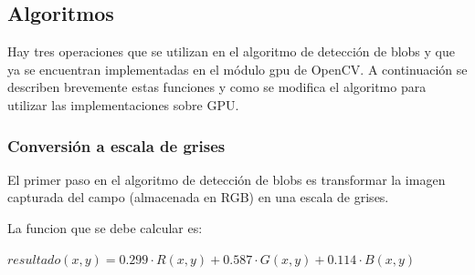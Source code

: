 \documentclass[a4paper,10pt]{report}
\begin{document}
\subsection{Algoritmos}




Hay tres operaciones que se utilizan en el algoritmo de detección de blobs y que ya se encuentran implementadas en el módulo gpu de OpenCV. 
A continuación se describen brevemente estas funciones y como se modifica el algoritmo para utilizar las implementaciones sobre GPU.

\subsubsection{Conversión a escala de grises}
El primer paso en el algoritmo de detección de blobs es transformar la imagen capturada del campo (almacenada en RGB) en una escala de grises.

La funcion que se debe calcular es: 
\begin{center}
\indent $resultado(x,y)= 0.299  \cdot R(x,y) + 0.587  \cdot G(x,y) + 0.114  \cdot B(x,y)$
 
\end{center}
\end{document}
